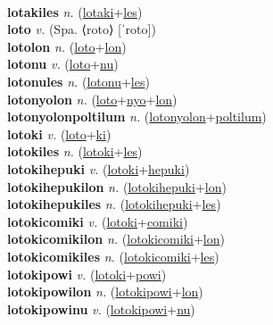  \label{lotaki} \\
\textbf{lotakiles} \textit{n.} (\hyperref[lotaki]{lotaki}+\hyperref[les]{les})
 \label{lotakiles} \\
\textbf{loto} \textit{v.} (Spa. ⟨roto⟩ [ˈroto])
 \label{loto} \\
\textbf{lotolon} \textit{n.} (\hyperref[loto]{loto}+\hyperref[lon]{lon})
 \label{lotolon} \\
\textbf{lotonu} \textit{v.} (\hyperref[loto]{loto}+\hyperref[nu]{nu})
 \label{lotonu} \\
\textbf{lotonules} \textit{n.} (\hyperref[lotonu]{lotonu}+\hyperref[les]{les})
 \label{lotonules} \\
\textbf{lotonyolon} \textit{n.} (\hyperref[loto]{loto}+\hyperref[nyo]{nyo}+\hyperref[lon]{lon})
 \label{lotonyolon} \\
\textbf{lotonyolonpoltilum} \textit{n.} (\hyperref[lotonyolon]{lotonyolon}+\hyperref[poltilum]{poltilum})
 \label{lotonyolonpoltilum} \\
\textbf{lotoki} \textit{v.} (\hyperref[loto]{loto}+\hyperref[ki]{ki})
 \label{lotoki} \\
\textbf{lotokiles} \textit{n.} (\hyperref[lotoki]{lotoki}+\hyperref[les]{les})
 \label{lotokiles} \\
\textbf{lotokihepuki} \textit{v.} (\hyperref[lotoki]{lotoki}+\hyperref[hepuki]{hepuki})
 \label{lotokihepuki} \\
\textbf{lotokihepukilon} \textit{n.} (\hyperref[lotokihepuki]{lotokihepuki}+\hyperref[lon]{lon})
 \label{lotokihepukilon} \\
\textbf{lotokihepukiles} \textit{n.} (\hyperref[lotokihepuki]{lotokihepuki}+\hyperref[les]{les})
 \label{lotokihepukiles} \\
\textbf{lotokicomiki} \textit{v.} (\hyperref[lotoki]{lotoki}+\hyperref[comiki]{comiki})
 \label{lotokicomiki} \\
\textbf{lotokicomikilon} \textit{n.} (\hyperref[lotokicomiki]{lotokicomiki}+\hyperref[lon]{lon})
 \label{lotokicomikilon} \\
\textbf{lotokicomikiles} \textit{n.} (\hyperref[lotokicomiki]{lotokicomiki}+\hyperref[les]{les})
 \label{lotokicomikiles} \\
\textbf{lotokipowi} \textit{v.} (\hyperref[lotoki]{lotoki}+\hyperref[powi]{powi})
 \label{lotokipowi} \\
\textbf{lotokipowilon} \textit{n.} (\hyperref[lotokipowi]{lotokipowi}+\hyperref[lon]{lon})
 \label{lotokipowilon} \\
\textbf{lotokipowinu} \textit{v.} (\hyperref[lotokipowi]{lotokipowi}+\hyperref[nu]{nu})
